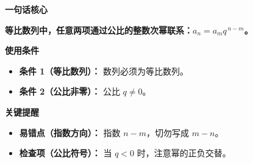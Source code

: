 \begin{summarybox}

	\textbf{\textcolor{CSummary}{一句话核心}}

	\textbf{等比数列中，任意两项通过公比的整数次幂联系：$a_n = a_m q^{\,n-m}$。}

	\medskip
	\textbf{\textcolor{CSummary}{使用条件}}

	\begin{itemize}[leftmargin=*, itemsep=0.5em, topsep=0.4em]
		\item \textbf{条件 1（等比数列）：} 数列必须为等比数列。
		\item \textbf{条件 2（公比非零）：} 公比 $q \neq 0$。
	\end{itemize}

	\medskip
	\textbf{\textcolor{CSummary}{关键提醒}}

	\begin{itemize}[leftmargin=*, itemsep=0.5em, topsep=0.4em]
		\item \textbf{易错点（指数方向）：} 指数 $n-m$，切勿写成 $m-n$。
		\item \textbf{检查项（公比符号）：} 当 $q<0$ 时，注意幂的正负交替。
	\end{itemize}

\end{summarybox}

